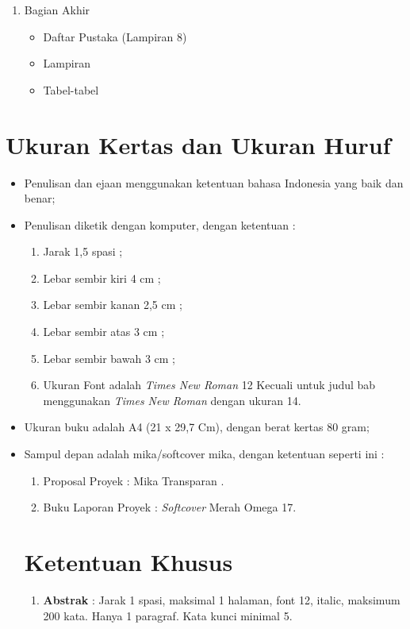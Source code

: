 \begin{enumerate}
			
\item Bagian Akhir
 \begin{itemize}
 	\item Daftar	Pustaka		(Lampiran	8)
 	\item Lampiran
 	\item Tabel-tabel
 \end{itemize} 
 		 	
\end{enumerate}

\section{Ukuran	Kertas	dan	Ukuran	Huruf}

\begin{itemize}
	\item Penulisan	 dan	 ejaan	 menggunakan	 ketentuan	 bahasa	 Indonesia	 yang	 baik	 dan	
benar;
	\item Penulisan	diketik	dengan	komputer,	dengan	ketentuan	:
		\begin{enumerate}
			\item Jarak	1,5 spasi ;
			\item Lebar	sembir	kiri	4	cm ;
			\item Lebar	sembir	kanan	2,5	cm ;
			\item Lebar	sembir	atas	3	cm ;
			\item Lebar	sembir	bawah	3	cm ;
			\item Ukuran	Font	adalah	\textit{Times	New	Roman} 12	Kecuali	untuk	judul	bab	menggunakan	\textit{Times New Roman} dengan	ukuran	14.
		\end{enumerate}
		
	\item Ukuran	buku	adalah	A4	(21	x	29,7	Cm),	dengan	berat	kertas	80	gram;
	
	\item Sampul	depan	adalah	mika/softcover mika,	dengan	ketentuan	seperti	ini	:
		\begin{enumerate}
			\item Proposal	Proyek   \qquad \qquad \enspace : Mika Transparan .
			\item Buku Laporan Proyek \qquad : \textit{Softcover} Merah Omega 17.
		\end{enumerate}
		
		
\section{Ketentuan	Khusus}
	\begin{enumerate}
		\item \textbf{Abstrak} : Jarak	 1	 spasi,	 maksimal	 1	 halaman,	 font	 12,	 italic,	 maksimum	 200	 kata.
Hanya	1	paragraf. Kata	kunci	minimal	5.


\end{enumerate}
\end{itemize}
